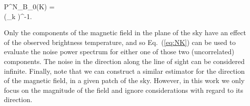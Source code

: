 \beq
\bga
P^N_{B_0}(\vec K) = \\
\left(\sum_{\vec k}  \right)^{-1}.
\label{eq:NK}
\ega
\eeq

Only the components of the magnetic field in the plane of the sky have an effect of the observed brightness temperature, and so Eq.~(\ref{eq:NK}) can be used to evaluate the noise power spectrum for either one of those two (uncorrelated) components. The noise in the direction along the line of sight can be considered infinite. Finally, note that we can construct a similar estimator for the direction of the magnetic field, in a given patch of the sky. However, in this work we only focus on the magnitude of the field and ignore considerations with regard to its direction.